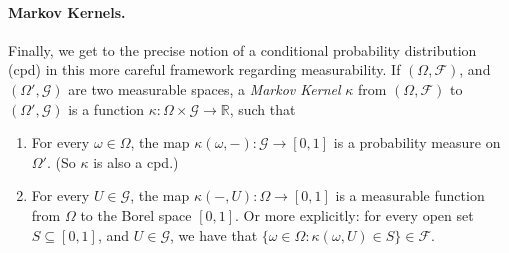 


\paragraph{Markov Kernels.}
Finally, we get to the precise notion of a conditional probability distribution (cpd) 
in this more careful framework regarding measurability.
If $(\Omega, \mathcal F)$, and $(\Omega', \mathcal G)$ are two measurable spaces, a \emph{Markov Kernel} 
$\kappa$ from $(\Omega,\mathcal F)$ to $(\Omega', \mathcal G)$
is a function $\kappa : \Omega \times \mathcal G \to \mathbb R$, such that

\begin{enumerate}
    \item For every $\omega \in \Omega$, the map $\kappa(\omega, -) : \mathcal G \to [0,1]$ is a probability measure on $\Omega'$. 
        (So $\kappa$ is also a cpd.)
    \item For every $U \in \mathcal G$, the map $\kappa(-, U) : \Omega \to [0,1]$ is a measurable function from $\Omega$ to the Borel space $[0,1]$.
    Or more explicitly: for every open set $S \subseteq [0,1]$, and $U \in \mathcal G$, we have that
    $\{\omega \in \Omega : \kappa(\omega,U) \in S\} \in \mathcal F$. 
\end{enumerate}

